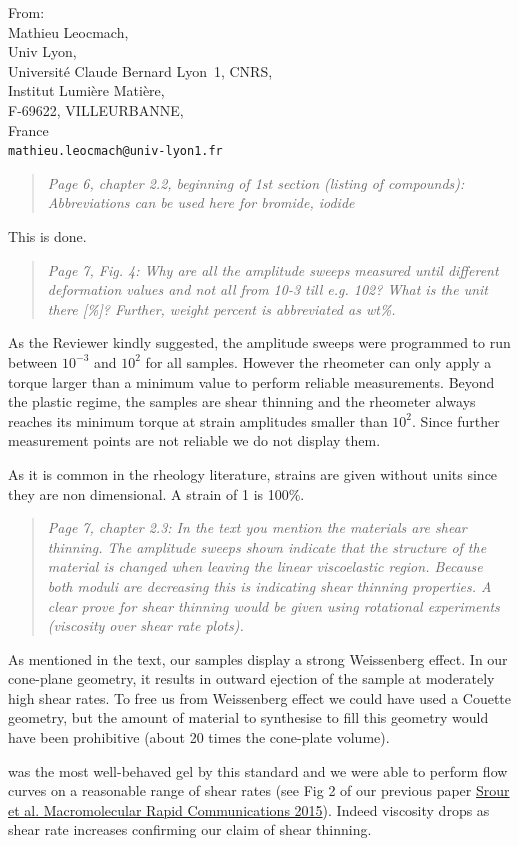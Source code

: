 \documentclass[a4paper, parskip=true, firsthead=false, fromemail=true, foldmarks=false]{scrlttr2}
\newenvironment{quotationi}
{\begin{quotation}\itshape}
{\end{quotation}}
\begin{document}
\begin{letter}{From:\\
Mathieu Leocmach,\\
Univ Lyon,\\ 
Universit\'e Claude Bernard Lyon~1, CNRS,\\
Institut Lumi\`ere Mati\`ere,\\
F-69622, VILLEURBANNE,\\
France\\
\texttt{mathieu.leocmach@univ-lyon1.fr}
}
\begin{quotationi}
Page 6, chapter 2.2, beginning of 1st section (listing of compounds): Abbreviations can be used here for bromide, iodide 
\end{quotationi}

This is done.

\begin{quotationi}
Page 7, Fig. 4: Why are all the amplitude sweeps measured until different deformation values and not all from 10-3 till e.g. 102? What is the unit there [\%]? Further, weight percent is abbreviated as wt\%.
\end{quotationi}

As the Reviewer kindly suggested, the amplitude sweeps were programmed to run between $10^{-3}$ and $10^2$ for all samples. However the rheometer can only apply a torque larger than a minimum value to perform reliable measurements. Beyond the plastic regime, the samples are shear thinning and the rheometer always reaches its minimum torque at strain amplitudes smaller than $10^2$. Since further measurement points are not reliable we do not display them.

As it is common in the rheology literature, strains are given without units since they are non dimensional. A strain of 1 is 100\%.

\begin{quotationi}
Page 7, chapter 2.3: In the text you mention the materials are shear thinning. The amplitude sweeps shown indicate that the structure of the material is changed when leaving the linear viscoelastic region. Because both moduli are decreasing this is indicating shear thinning properties. A clear prove for shear thinning would be given using rotational experiments (viscosity over shear rate plots).
\end{quotationi}

As mentioned in the text, our samples display a strong Weissenberg effect. In our cone-plane geometry, it results in outward ejection of the sample at moderately high shear rates. To free us from Weissenberg effect we could have used a Couette geometry, but the amount of material to synthesise to fill this geometry would have been prohibitive (about 20 times the cone-plate volume).

 was the most well-behaved gel by this standard and we were able to perform flow curves on a reasonable range of shear rates (see Fig 2 of our previous paper \href{http://doi.org/10.1002/marc.201400478}{Srour et al. Macromolecular Rapid Communications 2015}). Indeed viscosity drops as shear rate increases confirming our claim of shear thinning.


\end{letter}
\end{document}
